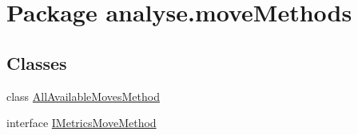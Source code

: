 \hypertarget{namespaceanalyse_1_1move_methods}{}\section{Package analyse.\+move\+Methods}
\label{namespaceanalyse_1_1move_methods}
\subsection*{Classes}
\begin{DoxyCompactItemize}
\item 
class \mbox{\hyperlink{classanalyse_1_1move_methods_1_1_all_available_moves_method}{All\+Available\+Moves\+Method}}
\item 
interface \mbox{\hyperlink{interfaceanalyse_1_1move_methods_1_1_i_metrics_move_method}{I\+Metrics\+Move\+Method}}
\end{DoxyCompactItemize}
